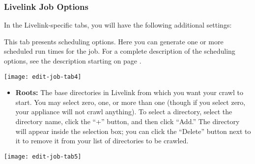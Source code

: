 %
%

\subsubsection{Livelink Job Options}

In the Livelink-specific tabs, you will have the following additional
settings:


\ifLivelinkGuide

\fi

\ifCombinedConnectorGuide
This tab presents scheduling options. Here you can generate one or
more scheduled run times for the job. For a complete description of
the scheduling options, see the description starting on page
\pageref{scheduling}.
\fi

\texttt{[image: edit-job-tab4]}

\begin{itemize}

\item \textbf{Roots:} The base directories in Livelink from which you
want your crawl to start. You may select zero, one, or more than one
(though if you select zero, your appliance will not crawl anything). 
To select a directory, select the directory name, click the ``+''
button, and then click ``Add.'' The directory will appear inside the selection
box; you can click the ``Delete'' button next to it to remove it from
your list of directories to be crawled.

\end{itemize}

\texttt{[image: edit-job-tab5]}

